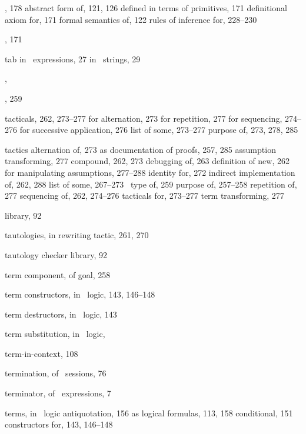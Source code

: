 \begin{theindex}
  \item {}, 178
    \subitem abstract form of, 121, 126
    \subitem defined in terms of primitives, 171
    \subitem definitional axiom for, 171
    \subitem formal semantics of, 122
    \subitem rules of inference for, 228--230
  \item {}, 171
  \item tab
    \subitem in \ML\ expressions, 27
    \subitem in \ML\ strings, 29
  \item {}, 
  \item {}, 259
  \item tacticals, 262, 273--277
    \subitem for alternation, 273
    \subitem for repetition, 277
    \subitem for sequencing, 274--276
    \subitem for successive application, 276
    \subitem list of some, 273--277
    \subitem purpose of, 273, 278, 285
  \item tactics
    \subitem alternation of, 273
    \subitem as documentation of proofs, 257, 285
    \subitem assumption transforming, 277
    \subitem compound, 262, 273
    \subitem debugging of, 263
    \subitem definition of new, 262
    \subitem for manipulating assumptions, 277--288
    \subitem identity for, 272
    \subitem indirect implementation of, 262, 288
    \subitem list of some, 267--273
    \subitem \ML\ type of, 259
    \subitem purpose of, 257--258
    \subitem repetition of, 277
    \subitem sequencing of, 262, 274--276
    \subitem tacticals for, 273--277
    \subitem term transforming, 277
  \item {} library, 92
  \item tautologies, in rewriting tactic, 261, 270
  \item tautology checker library, 92
  \item term component, of goal, 258
  \item term constructors, in \HOL\ logic, 143, 146--148
  \item term destructors, in \HOL\ logic, 143
  \item term substitution, in \HOL\ logic, 
  \item term-in-context, 108
  \item termination, of \HOL\ sessions, 76
  \item terminator, of \ML\ expressions, 7
  \item terms, in \HOL\ logic
    \subitem antiquotation, 156
    \subitem as logical formulas, 113, 158
    \subitem conditional, 151
    \subitem constructors for, 143, 146--148

\end{theindex}
